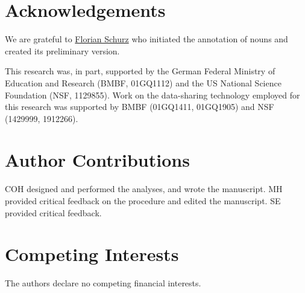 \documentclass[english,11pt]{article}
\begin{document}
{\small
}


%
%


\section*{Acknowledgements}


We are grateful to \href{www.florianschurz.de}{Florian Schurz} who initiated the
annotation of nouns and created its preliminary version.%

This research was, in part, supported by the German Federal Ministry of
Education and Research (BMBF, 01GQ1112) and the US National Science Foundation
(NSF, 1129855). Work on the data-sharing technology employed for this research
was supported by BMBF (01GQ1411, 01GQ1905) and NSF (1429999, 1912266).


\section*{Author Contributions}

COH designed and performed the analyses, and wrote the manuscript.
%
MH provided critical feedback on the procedure and edited the manuscript.
%
SE provided critical feedback.


\section*{Competing Interests}

The authors declare no competing financial interests.
\end{document}
